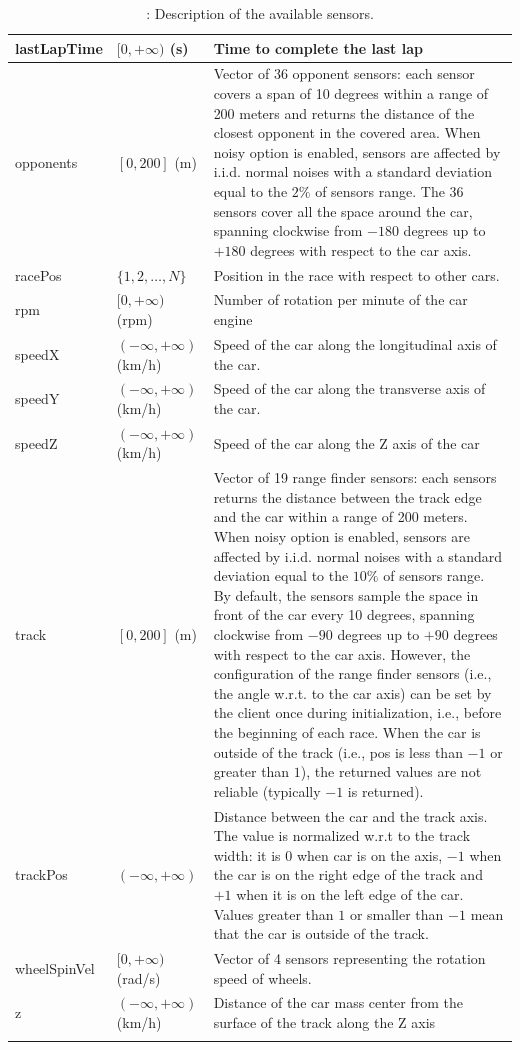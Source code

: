 \documentclass[declaration,shortabstract,english,inz]{iithesis}
\begin{document}
\begin{center}
\begin{longtable}{ | p{} |p{}| p{} |}
     lastLapTime & $[0, +\infty)$ (s) & Time to complete the last lap \\
     \hline
     opponents & $[0, 200]$ (m) & Vector of 36 opponent sensors: each sensor covers a span of 10 degrees within a range of 200 meters and returns the distance of the closest opponent in the covered area. When noisy option is enabled, sensors are affected by i.i.d. normal noises with a standard deviation equal to the $2\%$ of sensors range. The 36 sensors cover all the space around the car, spanning clockwise from $-180$ degrees up to $+180$ degrees with respect to the car axis. \\
     \hline
     racePos & $\{1,2,\dots,N\}$ & Position in the race with respect to other cars. \\
     \hline
     rpm & $[0, +\infty)$ (rpm) & Number of rotation per minute of the car engine \\
     \hline
     speedX & $ ( -\infty, +\infty ) $ (km/h) & Speed of the car along the longitudinal axis of the car. \\
     \hline
     speedY & $ ( -\infty, +\infty ) $ (km/h) & Speed of the car along the transverse axis of the car. \\
     \hline
     speedZ & $ ( -\infty, +\infty ) $ (km/h) & Speed of the car along the Z axis of the car \\
     \hline        
     track &  $[0, 200]$ (m) & Vector of 19 range finder sensors: each sensors returns the distance between the track edge and the car within a range of 200 meters. When noisy option is enabled, sensors are affected by i.i.d. normal noises with a standard deviation equal to the $10\%$ of sensors range. By default, the sensors sample the space in front of the car every 10 degrees, spanning clockwise from $-90$ degrees up to $+90$ degrees with respect to the car axis. However, the configuration of the range finder sensors (i.e., the angle w.r.t. to the car axis) can be set by the client once during initialization, i.e., before the beginning of each race. When the car is outside of the track (i.e., pos is less than $-1$ or greater than $1$), the returned values are not reliable (typically $-1$ is returned). \\
     \hline
     trackPos & $( -\infty, +\infty )$ & Distance between the car and the track axis. The value is normalized w.r.t to the track width: it is $0$ when car is on the axis, $-1$ when the car is on the right edge of the track and $+1$ when it is on the left edge of the car. Values greater than $1$ or smaller than $-1$ mean that the car is outside of the track. \\
     \hline
     wheelSpinVel & $[0, +\infty)$ (rad/s) & Vector of 4 sensors representing the rotation speed of wheels. \\
     \hline
     z & $( -\infty, +\infty ) $ (km/h) & Distance of the car mass center from the surface of the track
     along the Z axis \\
     \hline
     \caption{\label{tab:torcs_sensors}: Description of the available sensors.}
    \end{longtable}


\end{center}
\end{document}
